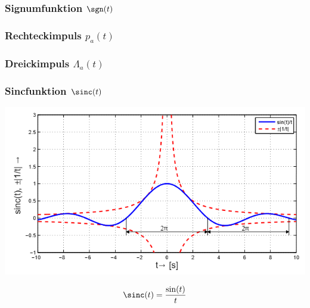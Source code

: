 \subsubsection{Signumfunktion $\sgn(t)$}
\subsubsection{Rechteckimpuls $p_a(t)$}
\subsubsection{Dreickimpuls $\Lambda_a(t)$}
\subsubsection{Sincfunktion $\sinc(t)$}
\begin{center}
	\begin{minipage}{0.2\textwidth}
		\includegraphics[width=\linewidth,keepaspectratio=true]{Images/sinc}
	\end{minipage}%
	\begin{minipage}{0.2\textwidth}
		\[\sinc(t) = \frac{\sin(t)}{t}\]
	\end{minipage}
\end{center}

